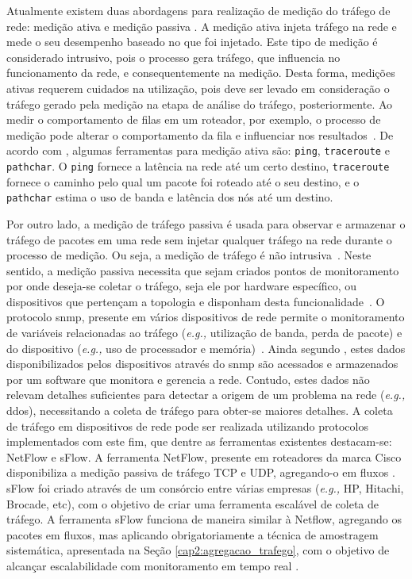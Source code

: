 Atualmente existem duas abordagens para realização de medição do tráfego de rede: medição ativa e medição passiva \cite{vilela:2006:caracterizacao, williamson:2001:internet}.
%
A medição ativa injeta tráfego na rede e mede o seu desempenho baseado no que foi injetado.
%
Este tipo de medição é considerado intrusivo, pois o processo gera tráfego, que influencia no funcionamento da rede, e consequentemente na medição.
%
Desta forma, medições ativas requerem cuidados na utilização, pois deve ser levado em consideração o tráfego gerado pela medição na etapa de análise do tráfego, posteriormente.
%
Ao medir o comportamento de filas em um roteador, por exemplo, o processo de medição pode alterar o comportamento da fila e influenciar nos resultados~\cite{vilela:2006:caracterizacao}.
%
De acordo com , algumas ferramentas para medição ativa são: \texttt{ping}, \texttt{traceroute} e \texttt{pathchar}. O \texttt{ping} fornece a latência na rede até um certo destino, \texttt{traceroute} fornece o caminho pelo qual um pacote foi roteado até o seu destino, e o \texttt{pathchar} estima o uso de banda e latência dos nós até um destino.

Por outro lado, a medição de tráfego passiva é usada para observar e armazenar o tráfego de pacotes em uma rede sem injetar qualquer tráfego na rede durante o processo de medição.
%
Ou seja, a medição de tráfego é não intrusiva~\cite{williamson:2001:internet}.
%
Neste sentido, a medição passiva necessita que sejam criados pontos de monitoramento por onde deseja-se coletar o tráfego, seja ele por hardware específico, ou dispositivos que pertençam a topologia e disponham desta funcionalidade~\cite{vilela:2006:caracterizacao}.
%
O protocolo \ac{snmp}, presente em vários dispositivos de rede permite o monitoramento de variáveis relacionadas ao tráfego (\textit{e.g.,} utilização de banda, perda de pacote) e do dispositivo (\textit{e.g.,} uso de processador e memória)~\cite{grossglauser:2002:snmp}.
%
Ainda segundo , estes dados disponibilizados pelos dispositivos através do \ac{snmp} são acessados e armazenados por um software que monitora e gerencia a rede.
%
Contudo, estes dados não relevam detalhes suficientes para detectar a origem de um problema na rede (\textit{e.g.,} \ac{ddos}), necessitando a coleta de tráfego para obter-se maiores detalhes.
%
A coleta de tráfego em dispositivos de rede pode ser realizada utilizando protocolos implementados com este fim, que dentre as ferramentas existentes destacam-se: NetFlow e sFlow.
%
A ferramenta NetFlow, presente em roteadores da marca Cisco disponibiliza a medição passiva de tráfego TCP e UDP, agregando-o em fluxos \cite{vilela:2006:caracterizacao}.
%
sFlow foi criado através de um consórcio entre várias empresas (\textit{e.g.,} HP, Hitachi, Brocade, etc), com o objetivo de criar uma ferramenta escalável de coleta de tráfego.
%
A ferramenta sFlow funciona de maneira similar à Netflow, agregando os pacotes em fluxos, mas aplicando obrigatoriamente a técnica de amostragem sistemática, apresentada na Seção \ref{cap2:agregacao_trafego}, com o objetivo de alcançar escalabilidade com monitoramento em tempo real \cite{sflow:2003}.



